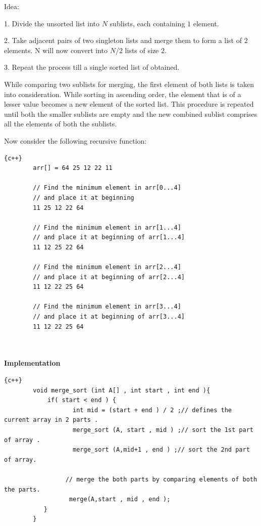 Idea:

1. Divide the unsorted list into $N$ sublists, each containing  $1$ element.

2. Take adjacent pairs of two singleton lists and merge them to form a list of $2$ elements. N will now convert into $N $/$ 2$ lists of size $2$.

3. Repeat the process till a single sorted list of obtained.

\hspace{7mm}While comparing two sublists for merging, the first element of both lists is taken into consideration. While sorting in ascending order, the element that is of a lesser value becomes a new element of the sorted list. This procedure is repeated until both the smaller sublists are empty and the new combined sublist comprises all the elements of both the sublists.

Now consider the following recursive function:
\begin{lstlisting}{c++}
        arr[] = 64 25 12 22 11
        
        // Find the minimum element in arr[0...4]
        // and place it at beginning
        11 25 12 22 64
        
        // Find the minimum element in arr[1...4]
        // and place it at beginning of arr[1...4]
        11 12 25 22 64
        
        // Find the minimum element in arr[2...4]
        // and place it at beginning of arr[2...4]
        11 12 22 25 64
        
        // Find the minimum element in arr[3...4]
        // and place it at beginning of arr[3...4]
        11 12 22 25 64 

\end{lstlisting}
\\
\\
\newline\newline
\textbf{{\Large{Implementation}}}
\begin{lstlisting}{c++}
        void merge_sort (int A[] , int start , int end ){
            if( start < end ) {
                   int mid = (start + end ) / 2 ;// defines the current array in 2 parts .
                   merge_sort (A, start , mid ) ;// sort the 1st part of array .
                   merge_sort (A,mid+1 , end ) ;// sort the 2nd part of array.
        
                 // merge the both parts by comparing elements of both the parts.
                  merge(A,start , mid , end );   
           }                    
        }
\end{lstlisting}

